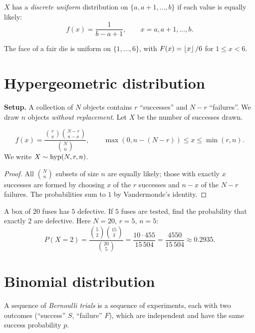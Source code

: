 \begin{definition}
$X$ has a \emph{discrete uniform} distribution on $\{a, a+1, \dots, b\}$ if each value is
equally likely:
\[
  f(x) = \frac{1}{b-a+1}, \qquad x = a, a+1, \dots, b.
\]
\end{definition}

\begin{example}
The face of a fair die is uniform on $\{1,\dots,6\}$, with $F(x) = \left\lfloor x \right\rfloor/6$ for
$1 \le x < 6$.
\end{example}

\section{Hypergeometric distribution}

\textbf{Setup.} A collection of $N$ objects contains $r$ ``successes'' and $N-r$
``failures''. We draw $n$ objects \emph{without replacement}. Let $X$ be the number of
successes drawn.

\begin{theorem}[Hypergeometric p.f.]
\[
  f(x) = \frac{\binom{r}{x}\binom{N-r}{n-x}}{\binom{N}{n}},
  \qquad \max(0, n-(N-r)) \le x \le \min(r, n).
\]
We write $X \sim \operatorname{hyp}(N, r, n)$.
\end{theorem}

\begin{proof}
All $\binom Nn$ subsets of size $n$ are equally likely; those with exactly $x$ successes
are formed by choosing $x$ of the $r$ successes and $n-x$ of the $N-r$ failures. The
probabilities sum to $1$ by Vandermonde's identity.
\end{proof}

\begin{example}
A box of $20$ fuses has $5$ defective. If $5$ fuses are tested, find the probability that
exactly $2$ are defective. Here $N=20$, $r=5$, $n=5$:
\[
  P(X=2) = \frac{\binom52\binom{15}3}{\binom{20}5} = \frac{10\cdot 455}{15\,504}
  = \frac{4550}{15\,504} \approx 0.2935.
\]
\end{example}

\section{Binomial distribution}

\begin{definition}
A sequence of \emph{Bernoulli trials} is a sequence of experiments, each with two
outcomes (``success'' $S$, ``failure'' $F$), which are independent and have the same
success probability $p$.
\end{definition}

